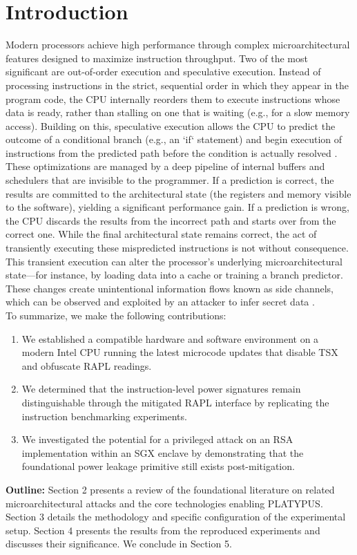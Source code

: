 \section{Introduction}
Modern processors achieve high performance through complex microarchitectural features designed to maximize instruction throughput. Two of the most significant are out-of-order execution and speculative execution. Instead of processing instructions in the strict, sequential order in which they appear in the program code, the CPU internally reorders them to execute instructions whose data is ready, rather than stalling on one that is waiting (e.g., for a slow memory access). Building on this, speculative execution allows
the CPU to predict the outcome of a conditional branch (e.g., an ‘if‘ statement) and begin execution of instructions from the predicted path before the condition is actually resolved \cite{8835233}.
These optimizations are managed by a deep pipeline of internal buffers and schedulers that are invisible to the programmer. If a prediction is correct, the results are committed to the architectural state (the registers and memory visible to the software), yielding a significant performance gain. If a prediction is wrong, the CPU discards the results from the incorrect path and starts over from the correct one. While the final architectural state remains correct, the act of transiently executing these mispredicted instructions is not without consequence. This transient execution can alter the processor’s underlying microarchitectural state—for instance, by loading data into a cache or training a branch
predictor. These changes create unintentional information flows known as side channels, which can be observed and exploited by an attacker to infer secret data \cite{3b07f496768442f48538a30b9f302940}.\\
To summarize, we make the following contributions:
\begin{enumerate}
\item We established a compatible hardware and software environment on a modern Intel CPU
running the latest microcode updates that disable TSX and obfuscate RAPL readings.
\item We determined that the instruction-level power signatures remain distinguishable through the
mitigated RAPL interface by replicating the instruction benchmarking experiments.
\item We investigated the potential for a privileged attack on an RSA implementation within
an SGX enclave by demonstrating that the foundational power leakage primitive
still exists post-mitigation.
\end{enumerate}
\textbf{Outline:} Section 2 presents a review of the foundational literature on related microarchitectural attacks and the core technologies enabling PLATYPUS. Section 3 details the methodology and specific configuration of the experimental setup. Section 4 presents the results from the reproduced experiments and discusses their
significance. We conclude in Section 5.